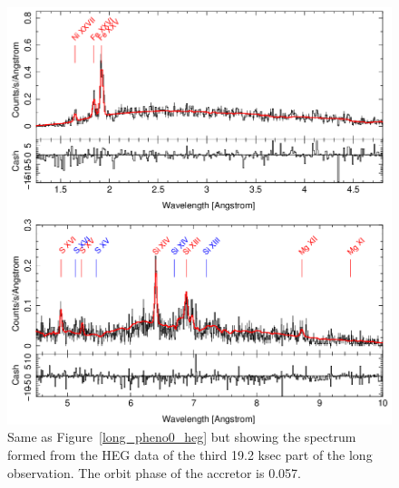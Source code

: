 \begin{figure}[t]
    \centering
        \includegraphics[width = \linewidth]{Chapters/Figures/long_pheno2_heg.png}
        \caption{Same as Figure~\ref{long_pheno0_heg} but showing the spectrum formed from the HEG data of the third 19.2 ksec part of the long observation. The orbit phase of the accretor is 0.057.}
    \label{long_pheno2_heg}
\end{figure}


